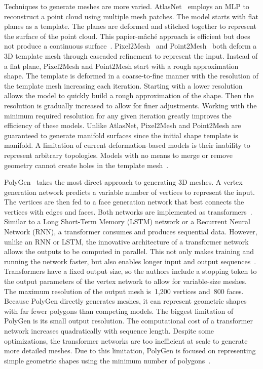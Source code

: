 Techniques to generate meshes are more varied. AtlasNet~\cite{Groueix2018} employs an MLP to reconstruct a point cloud using multiple mesh patches. The model starts with flat planes as a template. The planes are deformed and stitched together to represent the surface of the point cloud. This papier-m{\^a}ch{\'e} approach is efficient but does not produce a continuous surface~\cite{Groueix2018}. Pixel2Mesh~\cite{Wang2018} and Point2Mesh~\cite{Hanocka2020} both deform a 3D template mesh through cascaded refinement to represent the input. Instead of a flat plane, Pixel2Mesh and Point2Mesh start with a rough approximation shape. The template is deformed in a coarse-to-fine manner with the resolution of the template mesh increasing each iteration. Starting with a lower resolution allows the model to quickly build a rough approximation of the shape. Then the resolution is gradually increased to allow for finer adjustments. Working with the minimum required resolution for any given iteration greatly improves the efficiency of these models. Unlike AtlasNet, Pixel2Mesh and Point2Mesh are guaranteed to generate manifold surfaces since the initial shape template is manifold. A limitation of current deformation-based models is their inability to represent arbitrary topologies. Models with no means to merge or remove geometry cannot create holes in the template mesh~\cite{Wang2018, Hanocka2020}.


PolyGen~\cite{Nash2020} takes the most direct approach to generating 3D meshes. A vertex generation network predicts a variable number of vertices to represent the input. The vertices are then fed to a face generation network that best connects the vertices with edges and faces. Both networks are implemented as transformers~\cite{Nash2020}. Similar to a Long Short-Term Memory (LSTM) network or a Recurrent Neural Network (RNN), a transformer consumes and produces sequential data. However, unlike an RNN or LSTM, the innovative architecture of a transformer network allows the outputs to be computed in parallel. This not only makes training and running the network faster, but also enables longer input and output sequences~\cite{Vaswani2017}. Transformers have a fixed output size, so the authors include a stopping token to the output parameters of the vertex network to allow for variable-size meshes. The maximum resolution of the output mesh is~1,200 vertices and~800 faces. Because PolyGen directly generates meshes, it can represent geometric shapes with far fewer polygons than competing models. The biggest limitation of PolyGen is its small output resolution. The computational cost of a transformer network increases quadratically with sequence length. Despite some optimizations, the transformer networks are too inefficient at scale to generate more detailed meshes. Due to this limitation, PolyGen is focused on representing simple geometric shapes using the minimum number of polygons~\cite{Nash2020}.

